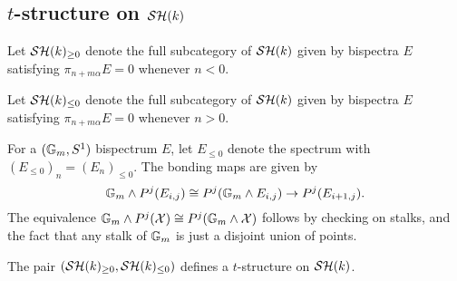 \documentclass{amsart}%
\begin{document}
\subsection{$t$-structure on $\mathcal{SH}(k)$}

\begin{definition}
  Let $\mathcal{SH}(k)_{\geq 0}$ denote the full subcategory of $\mathcal{SH}(k)$ given
  by bispectra $E$ satisfying $\pi_{n+m\alpha}E = 0 $ whenever
  $n < 0$.

  Let $\mathcal{SH}(k)_{\leq 0}$ denote the full subcategory of $\mathcal{SH}(k)$ given
  by bispectra $E$ satisfying $\pi_{n+m\alpha}E = 0$ whenever $n >0$. 
\end{definition}

\begin{definition}
  For a $(\mathbb{G}_m, S^1)$ bispectrum $E$, let $E_{\leq 0}$ denote the
  spectrum with $(E_{\leq 0})_n = (E_n)_{\leq 0}$. The bonding maps
  are given by 
  \begin{equation*}
    \mathbb{G}_m \wedge P^j(E_{i,j}) \cong P^j( \mathbb{G}_m \wedge E_{i,j}) \to P^j( E_{i+1,j}).
  \end{equation*}
  The equivalence
  $\mathbb{G}_m \wedge P^j(\mathcal{X}) \cong P^j(\mathbb{G}_m\wedge \mathcal{X})$ follows by
  checking on stalks, and the fact that any stalk of $\mathbb{G}_m$ is just
  a disjoint union of points. 
\end{definition}

\begin{theorem}
  The pair $(\mathcal{SH}(k)_{\geq 0}, \mathcal{SH}(k)_{\leq 0})$ defines a
  $t$-structure on $\mathcal{SH}(k)$.
\end{theorem}
\end{document}
